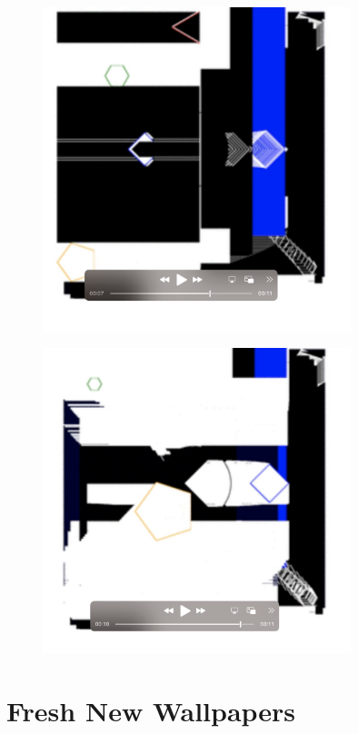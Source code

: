 \documentclass[12pt]{book}
\begin{document}
\begin{figure}
    \centering
    \includegraphics[width=0.8\textwidth]{rendering/figures/s5.png}
\end{figure}
\begin{figure}
    \centering
    \includegraphics[width=0.8\textwidth]{rendering/figures/s6.png}
\end{figure}



\chapter{Fresh New Wallpapers}
\end{document}
